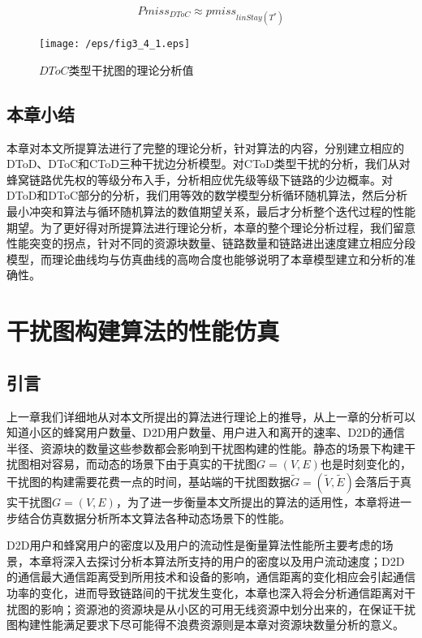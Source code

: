 \documentclass[figurelist,tablelist,algorithmlist,nomlist,masters]{seuthesix}
\begin{document}
	\begin{equation}\label{eq3.1}
	Pmis{s_{DToC}} \approx pmis{s_{linStay({T^*})}}
	\end{equation}
	
	\begin{figure}[!h]
		\centering
		\texttt{[image: /eps/fig3\_4\_1.eps]}
		\caption{$DToC$类型干扰图的理论分析值}
		\label{fig3_4_1}
	\end{figure}
	
	
	
	\section{本章小结}
	本章对本文所提算法进行了完整的理论分析，针对算法的内容，分别建立相应的DToD、DToC和CToD三种干扰边分析模型。对CToD类型干扰的分析，我们从对蜂窝链路优先权的等级分布入手，分析相应优先级等级下链路的少边概率。对DToD和DToC部分的分析，我们用等效的数学模型分析循环随机算法，然后分析最小冲突和算法与循环随机算法的数值期望关系，最后才分析整个迭代过程的性能期望。为了更好得对所提算法进行理论分析，本章的整个理论分析过程，我们留意性能突变的拐点，针对不同的资源块数量、链路数量和链路进出速度建立相应分段模型，而理论曲线均与仿真曲线的高吻合度也能够说明了本章模型建立和分析的准确性。
	
	
	
	
	\chapter{干扰图构建算法的性能仿真}
	\section{引言}
	上一章我们详细地从对本文所提出的算法进行理论上的推导，从上一章的分析可以知道小区的蜂窝用户数量、D2D用户数量、用户进入和离开的速率、D2D的通信半径、资源块的数量这些参数都会影响到干扰图构建的性能。静态的场景下构建干扰图相对容易，而动态的场景下由于真实的干扰图$G = (V,E)$也是时刻变化的，干扰图的构建需要花费一点的时间，基站端的干扰图数据$\tilde G = (\tilde V,\tilde E)$会落后于真实干扰图$G = (V,E)$，为了进一步衡量本文所提出的算法的适用性，本章将进一步结合仿真数据分析所本文算法各种动态场景下的性能。
	
	
	D2D用户和蜂窝用户的密度以及用户的流动性是衡量算法性能所主要考虑的场景，本章将深入去探讨分析本算法所支持的用户的密度以及用户流动速度；D2D的通信最大通信距离受到所用技术和设备的影响，通信距离的变化相应会引起通信功率的变化，进而导致链路间的干扰发生变化，本章也深入将会分析通信距离对干扰图的影响；资源池的资源块是从小区的可用无线资源中划分出来的，在保证干扰图构建性能满足要求下尽可能得不浪费资源则是本章对资源块数量分析的意义。
	
\end{document}
